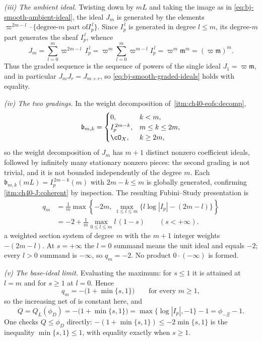 \begin{example}
\emph{(iii) The ambient ideal.}  Twisting down by $mL$ and taking the
image as in \eqref{eq:bj-smooth-ambient-ideal}, the ideal $J_m$ is
generated by the elements $\varpi^{2m-l}\cdot\{\text{degree-}m\text{ part of
}I_p^{\,l}\}$.  Since $I_p^{\,l}$ is generated in degree $l\le m$, its
degree-$m$ part generates the sheaf $I_p^{\,l}$, whence
\[
 J_m=\sum_{l=0}^{m}\varpi^{2m-l}\,I_p^{\,l}
    =\varpi^m\sum_{l=0}^{m}\varpi^{m-l}I_p^{\,l}
    =\varpi^m\mathfrak m^m
    =(\varpi\mathfrak m)^m .
\]
Thus the graded sequence is the sequence of powers of the single ideal
$J_1=\varpi\mathfrak m$, and in particular
$J_mJ_r=J_{m+r}$, so \eqref{eq:bj-smooth-graded-ideals} holds with
equality.

\emph{(iv) The two gradings.}  In the weight decomposition of
\,\cref{itm:ch40-eqfs:decomp},
\[
 \mathfrak b_{m,k}=
 \begin{cases}
 0,&k<m,\\
 I_p^{\,2m-k},&m\le k\le 2m,\\
 \cO_X,&k\ge2m,
 \end{cases}
\]
so the weight decomposition of $J_m$ has $m+1$ distinct nonzero
coefficient ideals, followed by infinitely many stationary nonzero pieces: the second grading is not trivial, and it is not bounded
independently of the degree $m$.  Each $\mathfrak b_{m,k}(mL)
=I_p^{\,2m-k}(m)$ with $2m-k\le m$ is globally generated, confirming
\,\cref{itm:ch40-J:coherent} by inspection.  The
resulting Fubini--Study presentation is
\[
 \begin{aligned}
 q_m&=\frac1m\max\left\{-2m,\
     \max_{1\le l\le m}\bigl\{l\log|I_p|-(2m-l)\bigr\}\right\}\\
    &=-2+\frac1m\max_{0\le l\le m}l\,(1-s)\qquad(s<+\infty).
 \end{aligned}
\]
a weighted section system of degree $m$ with the $m+1$ integer weights
$-(2m-l)$.  At $s=+\infty$ the $l=0$ summand means the unit
ideal and equals $-2$; every $l>0$ summand is $-\infty$, so $q_m=-2$.
No product $0\cdot(-\infty)$ is formed.

\emph{(v) The base-ideal limit.}  Evaluating the maximum: for $s\le1$ it
is attained at $l=m$ and for $s\ge1$ at $l=0$.  Hence
\[
 q_m=-\bigl(1+\min\{s,1\}\bigr)
 \qquad\text{for every }m\ge1,
\]
so the increasing net of  is constant here, and
\[
 Q=Q_L(\phi_D)=-\bigl(1+\min\{s,1\}\bigr)
   =\max\{\log|I_p|,-1\}-1
   =\phi_{-\Xi}-1 .
\]
One checks $Q\le\phi_D$ directly:
$-(1+\min\{s,1\})\le-2\min\{s,1\}$ is the inequality
$\min\{s,1\}\le1$, with equality exactly when $s\ge1$.


\end{example}
